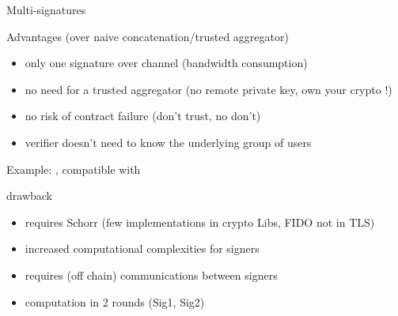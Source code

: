 \documentclass[aspectratio=43]{beamer}
\begin{document}
  \begin{frame}{Multi-signatures}

  
  {
  \begin{exampleblock}{Advantages (over naive concatenation/trusted aggregator)}
  \begin{itemize}
  \item only one signature over channel (bandwidth consumption)
  \item no need for a trusted aggregator (no remote private key, own your crypto !)
  \item no risk of contract failure (don't trust, no don't)
  \item verifier doesn't need to know the underlying group of users
  \end{itemize}
  \end{exampleblock}
  
  Example: \href{https://github.com/jonasnick/bips/blob/musig2/bip-musig2.mediawiki}{}, compatible with \href{https://en.bitcoin.it/wiki/BIP_0340}{}
  }
  {
  \begin{alertblock}{drawback}
   \begin{itemize}
  \item requires Schorr (few implementations in  crypto Libs, FIDO not in TLS) 
  \item increased computational complexities for signers
  \item requires (off chain) communications between signers  
  \item computation in 2 rounds (Sig1, Sig2)


\end{itemize}
\end{alertblock}}
\end{frame}
\end{document}
